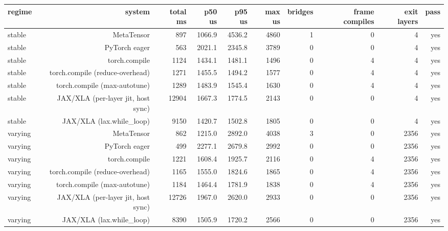 \begin{tabular}{lrrrrrrrrr}
\toprule
regime & system & total ms & p50 us & p95 us & max us & bridges & frame compiles & exit layers & pass \\
\midrule
stable & MetaTensor & 897 & 1066.9 & 4536.2 & 4860 & 1 & 0 & 4 & yes \\
stable & PyTorch eager & 563 & 2021.1 & 2345.8 & 3789 & 0 & 0 & 4 & yes \\
stable & torch.compile & 1124 & 1434.1 & 1481.1 & 1496 & 0 & 4 & 4 & yes \\
stable & torch.compile (reduce-overhead) & 1271 & 1455.5 & 1494.2 & 1577 & 0 & 4 & 4 & yes \\
stable & torch.compile (max-autotune) & 1289 & 1483.9 & 1545.4 & 1630 & 0 & 4 & 4 & yes \\
stable & JAX/XLA (per-layer jit, host sync) & 12904 & 1667.3 & 1774.5 & 2143 & 0 & 0 & 4 & yes \\
stable & JAX/XLA (lax.while\_loop) & 9150 & 1420.7 & 1502.8 & 1805 & 0 & 0 & 4 & yes \\
varying & MetaTensor & 862 & 1215.0 & 2892.0 & 4038 & 3 & 0 & 2356 & yes \\
varying & PyTorch eager & 499 & 2277.1 & 2679.8 & 2992 & 0 & 0 & 2356 & yes \\
varying & torch.compile & 1221 & 1608.4 & 1925.7 & 2116 & 0 & 4 & 2356 & yes \\
varying & torch.compile (reduce-overhead) & 1165 & 1555.0 & 1824.6 & 1865 & 0 & 4 & 2356 & yes \\
varying & torch.compile (max-autotune) & 1184 & 1464.4 & 1781.9 & 1838 & 0 & 4 & 2356 & yes \\
varying & JAX/XLA (per-layer jit, host sync) & 12726 & 1967.0 & 2620.0 & 2933 & 0 & 0 & 2356 & yes \\
varying & JAX/XLA (lax.while\_loop) & 8390 & 1505.9 & 1720.2 & 2566 & 0 & 0 & 2356 & yes \\
\bottomrule
\end{tabular}
